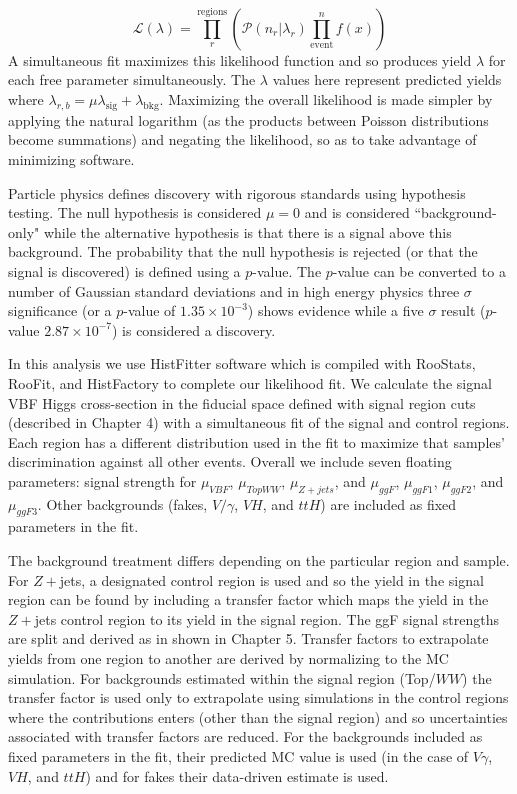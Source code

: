 \begin{equation}
\mathcal{L}(\lambda)=\prod_r^{\text{regions}}(\mathcal{P}(n_r|\lambda_r)\prod_{\text{event}}^n f(x))
\end{equation}
A simultaneous fit maximizes this likelihood function and so produces yield $\lambda$ for each free parameter simultaneously. The $\lambda$ values here represent predicted yields where $\lambda_{r,b} = \mu \lambda_{\text{sig}}+\lambda_{\text{bkg}}$. Maximizing the overall likelihood is made simpler by applying the natural logarithm (as the products between Poisson distributions become summations) and negating the likelihood, so as to take advantage of minimizing software.  

Particle physics defines discovery with rigorous standards using hypothesis testing. The null hypothesis is considered $\mu=0$ and is considered ``background-only" while the alternative hypothesis is that there is a signal above this background. The probability that the null hypothesis is rejected (or that the signal is discovered) is defined using a $p$-value. The $p$-value can be converted to a number of Gaussian standard deviations and in high energy physics three $\sigma$ significance (or a $p$-value of $1.35 \times 10^{-3}$) shows evidence while a five $\sigma$ result ($p$-value $2.87\times10^{-7}$) is considered a discovery.

In this analysis we use HistFitter software which is compiled with RooStats, RooFit, and HistFactory to complete our likelihood fit. We calculate the signal VBF Higgs cross-section in the fiducial space defined with signal region cuts (described in Chapter 4) with a simultaneous fit of the signal and control regions. Each region has a different distribution used in the fit to maximize that samples' discrimination against all other events. Overall we include seven floating parameters: signal strength for $\mu_{VBF}$, $\mu_{TopWW}$, $\mu_{Z+jets}$, and $\mu_{ggF}$, $\mu_{ggF1}$, $\mu_{ggF2}$, and $\mu_{ggF3}$. Other backgrounds (fakes, $V/\gamma$, $VH$, and $ttH$) are included as fixed parameters in the fit. 

The background treatment differs depending on the particular region and sample. For $Z+$jets, a designated control region is used and so the yield in the signal region can be found by including a transfer factor which maps the yield in the $Z+$jets control region to its yield in the signal region. The ggF signal strengths are split and derived as in shown in Chapter 5. Transfer factors to extrapolate yields from one region to another are derived by normalizing to the MC simulation. For backgrounds estimated within the signal region (Top/$WW$) the transfer factor is used only to extrapolate using simulations in the control regions where the contributions enters (other than the signal region) and so uncertainties associated with transfer factors are reduced. For the backgrounds included as fixed parameters in the fit, their predicted MC value is used (in the case of $V\gamma$, $VH$, and $ttH$) and for fakes their data-driven estimate is used. 

